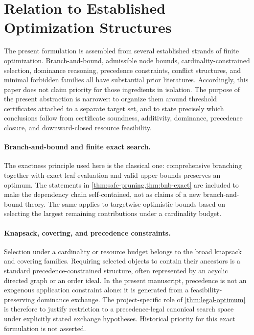 
\section{Relation to Established Optimization Structures}\label{sec:related-work}

The present formulation is assembled from several established strands of finite optimization. Branch-and-bound, admissible node bounds, cardinality-constrained selection, dominance reasoning, precedence constraints, conflict structures, and minimal forbidden families all have substantial prior literatures. Accordingly, this paper does not claim priority for those ingredients in isolation. The purpose of the present abstraction is narrower: to organize them around threshold certificates attached to a separate target set, and to state precisely which conclusions follow from certificate soundness, additivity, dominance, precedence closure, and downward-closed resource feasibility.

\paragraph{Branch-and-bound and finite exact search.}
The exactness principle used here is the classical one: comprehensive branching together with exact leaf evaluation and valid upper bounds preserves an optimum. The statements in \cref{thm:safe-pruning,thm:bnb-exact} are included to make the dependency chain self-contained, not as claims of a new branch-and-bound theory. The same applies to targetwise optimistic bounds based on selecting the largest remaining contributions under a cardinality budget.

\paragraph{Knapsack, covering, and precedence constraints.}
Selection under a cardinality or resource budget belongs to the broad knapsack and covering families. Requiring selected objects to contain their ancestors is a standard precedence-constrained structure, often represented by an acyclic directed graph or an order ideal. In the present manuscript, precedence is not an exogenous application constraint alone: it is generated from a feasibility-preserving dominance exchange. The project-specific role of \cref{thm:legal-optimum} is therefore to justify restriction to a precedence-legal canonical search space under explicitly stated exchange hypotheses. Historical priority for this exact formulation is not asserted.

